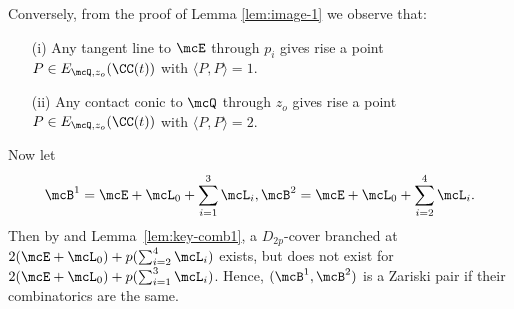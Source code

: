 \begin{remark}\label{rem:obs-1} Conversely, from the proof of Lemma \ref{lem:image-1} we observe that:

 \begin{enumerate}
 \item[(i)] Any tangent line to $\mcE$ through $p_i$ gives rise a point $P \in E_{\mcQ, z_o}(\CC(t))$ with $\langle P, P \rangle = 1$.
 
 \item[(ii)] Any contact conic to $\mcQ$ through $z_o$ gives rise a point $P \in E_{\mcQ, z_o}(\CC(t))$ with $\langle P, P \rangle = 2$.
 
 \end{enumerate}
\end{remark}
  
Now let
\[
\mcB^1=\mcE +\mcL_0+\sum_{i=1}^3 \mcL_i, 
\mcB^2=\mcE +\mcL_0+\sum_{i=2}^4 \mcL_i.
\]
Then by  \cite[Theorem 3.2]{tokunaga14} and  Lemma~\ref{lem:key-comb1}, a $D_{2p}$-cover branched at $2(\mcE+\mcL_0)+p(\sum_{i=2}^4 \mcL_i)$ exists, but does not exist for $2(\mcE +\mcL_0)+p(\sum_{i=1}^3 \mcL_i)$. Hence, $(\mcB^1, \mcB^2)$  is a Zariski pair
if their combinatorics are the same.
 \bigskip 
 
 
